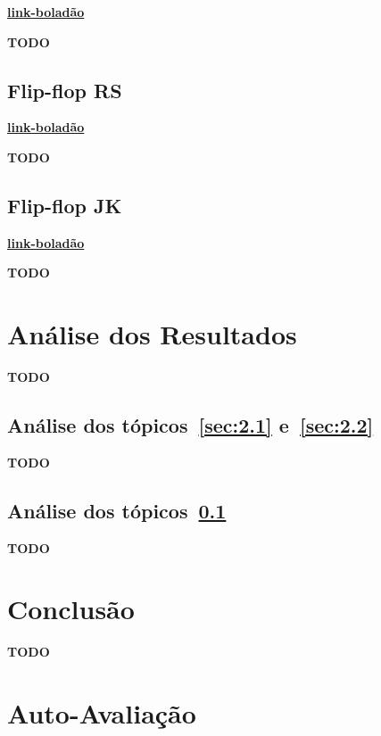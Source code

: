 \documentclass[12pt]{article}
\begin{document}
\href{link-boladão}{\textbf{link-boladão}}

\textbf{TODO}

\subsection{Flip-flop RS}\label{sec:2.3}

\href{link-boladão}{\textbf{link-boladão}}

\textbf{TODO}

\subsection{Flip-flop JK}\label{sec:2.4}

\href{link-boladão}{\textbf{link-boladão}}

\textbf{TODO}

\section{Análise dos Resultados}\label{sec:resultados}

\textbf{TODO}

\subsection{Análise dos tópicos~\ref{sec:2.1} e~\ref{sec:2.2}}\label{sec:analise2.1}

\textbf{TODO}

\subsection{Análise dos tópicos~\ref{sec:2.3}}\label{sec:analise2.4}

\textbf{TODO}

\section{Conclusão}\label{sec:Conclusao}

\textbf{TODO}

\nocite{*}



\newpage
\section*{Auto-Avaliação}
\end{document}
